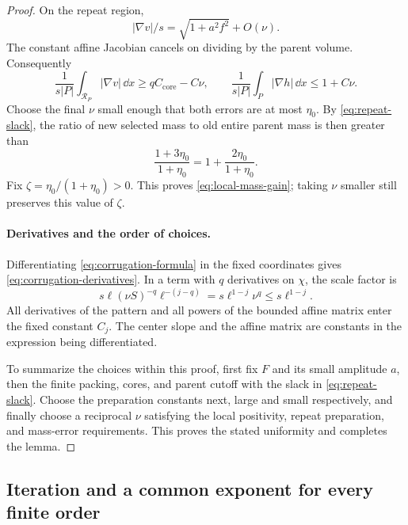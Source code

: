 \begin{proof}
On the repeat region,
\[
 |\nabla v|/s=\sqrt{1+a^2f^2}+O(\nu).
\]
The constant affine Jacobian cancels on dividing by the parent
volume.  Consequently
\[
 \frac1{s|P|}\int_{\mathcal R_P}|\nabla v|\,\dd x
 \ge qC_{\mathrm{core}}-C\nu,
 \qquad
 \frac1{s|P|}\int_P|\nabla h|\,\dd x\le1+C\nu.
\]
Choose the final $\nu$ small enough that both errors are at most
$\eta_0$.  By \eqref{eq:repeat-slack}, the ratio of new selected
mass to old entire parent mass is then greater than
\[
 \frac{1+3\eta_0}{1+\eta_0}
 =1+\frac{2\eta_0}{1+\eta_0}.
\]
Fix $\zeta=\eta_0/(1+\eta_0)>0$.  This proves
\eqref{eq:local-mass-gain}; taking $\nu$ smaller still preserves
this value of $\zeta$.

\paragraph{Derivatives and the order of choices.}
Differentiating \eqref{eq:corrugation-formula} in the fixed
coordinates gives \eqref{eq:corrugation-derivatives}.  In a term
with $q$ derivatives on $\chi$, the scale factor is
\[
 s\ell(\nu S)^{-q}\ell^{-(j-q)}
 =s\ell^{1-j}\nu^q\le s\ell^{1-j}.
\]
All derivatives of the pattern and all powers of the bounded affine
matrix enter the fixed constant $C_j$.  The center slope and the
affine matrix are constants in the expression being differentiated.

To summarize the choices within this proof, first fix $F$ and its
small amplitude $a$, then the finite packing, cores, and parent
cutoff with the slack in \eqref{eq:repeat-slack}.  Choose the
preparation constants next, large and small respectively, and
finally choose a reciprocal $\nu$ satisfying the local positivity,
repeat preparation, and mass-error requirements.  This proves the
stated uniformity and completes the lemma.
\end{proof}

\subsection{Iteration and a common exponent for every finite order}

